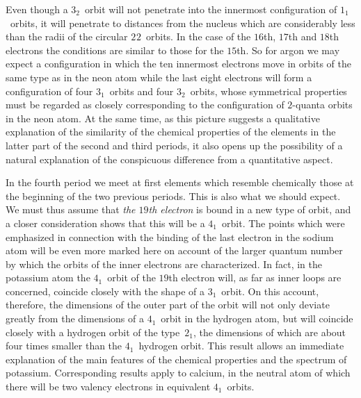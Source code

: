 Even though a $3_{2}$~orbit will not penetrate into the innermost configuration
of $1_{1}$~orbits, it will penetrate to distances from the nucleus
which are considerably less than the radii of the circular $2_{}2$~orbits.
In the case of the $16$th, $17$th and $18$th electrons the conditions are
similar to those for the $15$th. So for argon we may expect a configuration
in which the ten innermost electrons move in orbits of
the same type as in the neon atom while the last eight electrons will
form a configuration of four $3_{1}$~orbits and four $3_{2}$~orbits, whose
symmetrical properties must be regarded as closely corresponding
to the configuration of $2$-quanta orbits in the neon atom. At the
same time, as this picture suggests a qualitative explanation of the
similarity of the chemical properties of the elements in the latter
part of the second and third periods, it also opens up the possibility
of a natural explanation of the conspicuous difference from a
quantitative aspect.

 In the fourth period
we meet at first elements which resemble chemically those at the
beginning of the two previous periods. This is also what we should
expect. We must thus assume that \emph{the $19$th electron} is bound in
a new type of orbit, and a closer consideration shows that this will
be a $4_{1}$~orbit. The points which were emphasized in connection
with the binding of the last electron in the sodium atom will be
even more marked here on account of the larger quantum number
by which the orbits of the inner electrons are characterized. In
fact, in the potassium atom the $4_{1}$~orbit of the $19$th electron will,
as far as inner loops are concerned, coincide closely with the shape
of a $3_{1}$~orbit. On this account, therefore, the dimensions of the
outer part of the orbit will not only deviate greatly from the
dimensions of a $4_{1}$~orbit in the hydrogen atom, but will coincide
closely with a hydrogen orbit of the type~$2_{1}$, the dimensions of
which are about four times smaller than the $4_{1}$~hydrogen orbit.
This result allows an immediate explanation of the main features of
the chemical properties and the spectrum of potassium. Corresponding
results apply to calcium, in the neutral atom of which
there will be two valency electrons in equivalent $4_{1}$~orbits.

